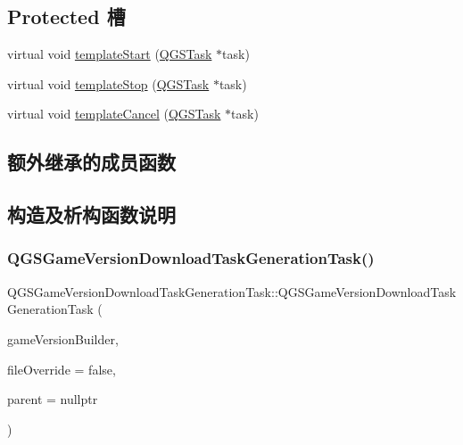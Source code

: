 \subsection*{Protected 槽}
\begin{DoxyCompactItemize}
\item 
virtual void \mbox{\hyperlink{class_q_g_s_game_version_download_task_generation_task_a183fcef1c1dd17f45a7db81ab5758e9c}{template\+Start}} (\mbox{\hyperlink{class_q_g_s_task}{Q\+G\+S\+Task}} $\ast$task)
\item 
virtual void \mbox{\hyperlink{class_q_g_s_game_version_download_task_generation_task_aa73d5a2f7aa252628d61269e71e17bf5}{template\+Stop}} (\mbox{\hyperlink{class_q_g_s_task}{Q\+G\+S\+Task}} $\ast$task)
\item 
virtual void \mbox{\hyperlink{class_q_g_s_game_version_download_task_generation_task_a80b34ce1f1d343c2ac5d21b31d994a75}{template\+Cancel}} (\mbox{\hyperlink{class_q_g_s_task}{Q\+G\+S\+Task}} $\ast$task)
\end{DoxyCompactItemize}
\subsection*{额外继承的成员函数}


\subsection{构造及析构函数说明}
\mbox{\label{class_q_g_s_game_version_download_task_generation_task_a1322ecb0832336398b63d9f938f6aeca}} 
\subsubsection{\texorpdfstring{Q\+G\+S\+Game\+Version\+Download\+Task\+Generation\+Task()}{QGSGameVersionDownloadTaskGenerationTask()}\hspace{0.1cm}{\footnotesize\ttfamily [1/3]}}
{\footnotesize\ttfamily Q\+G\+S\+Game\+Version\+Download\+Task\+Generation\+Task\+::\+Q\+G\+S\+Game\+Version\+Download\+Task\+Generation\+Task (\begin{DoxyParamCaption}\item[{\mbox{\hyperlink{class_q_g_s_game_version_builder}{Q\+G\+S\+Game\+Version\+Builder}} $\ast$}]{game\+Version\+Builder,  }\item[{bool}]{file\+Override = {\ttfamily false},  }\item[{Q\+Object $\ast$}]{parent = {\ttfamily nullptr} }\end{DoxyParamCaption})}

